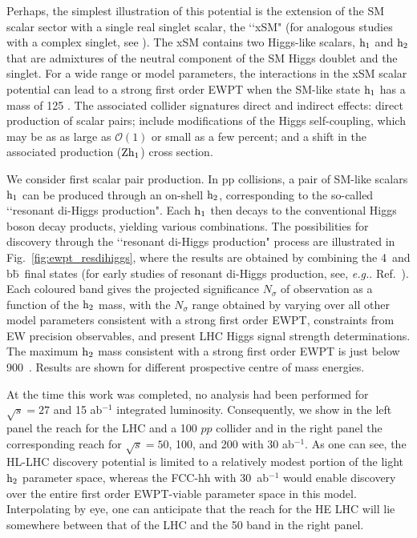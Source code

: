 Perhaps, the simplest illustration of this potential is the extension of the SM scalar sector with a single real singlet scalar\cite{Espinosa:1993bs,Choi:1993cv,Ham:2004cf,Profumo:2007wc,Cline:2012hg,Espinosa:2011ax,No:2013wsa,Curtin:2014jma,Kotwal:2016tex,Brauner:2016fla,Huang:2016cjm,Chen:2017qcz,Huang:2017jws}, the \lq\lq xSM" \cite{Barger:2007im} (for analogous studies with a complex singlet, see \cite{Jiang:2015cwa,Chiang:2017nmu}). 
The xSM contains two Higgs-like scalars, $\rm h_{1}$ and $\rm h_{2}$ that are admixtures of the neutral component of the SM Higgs doublet and the singlet. For a wide range or model parameters, the interactions in the xSM scalar potential can  lead to a strong first order EWPT when the SM-like state $\rm h_1$ has a mass of 125 \UGeV. The associated collider signatures direct and indirect effects:  direct production of scalar pairs; include modifications of the Higgs self-coupling, which may be as as large as $\mathcal{O}(1)$ or small as a few percent; and a shift in the associated production ($\rm Zh_1$) cross section. 

We consider first scalar pair production. In pp collisions, a pair of SM-like scalars $\rm h_1$ can be produced through an on-shell $\rm h_2$, corresponding to the so-called \lq\lq resonant di-Higgs production".  Each $\rm h_1$ then decays to the conventional Higgs boson decay products, yielding various combinations. The possibilities for discovery through the  \lq\lq resonant di-Higgs production" process are illustrated in Fig.~\ref{fig:ewpt_resdihiggs}, where the results are obtained by combining the 4\texttau\ and b\={b}\textgamma\textgamma\ final states\cite{Kotwal:2016tex} (for early studies of resonant di-Higgs production, see, {\it e.g.}. Ref.~\cite{Baur:2003gp}). Each coloured band gives the projected significance $N_\sigma$ of observation as a function of the $\rm h_2$ mass, with the $N_\sigma$ range obtained by varying over all other model parameters consistent with a strong first order EWPT, constraints from EW precision observables, and present LHC Higgs signal strength determinations.  The maximum $\rm h_2$ mass consistent with a strong first order EWPT is just below 900~\UGeV.  Results are shown for different prospective centre of mass energies.

At the time this work was completed, no analysis had been performed for $\sqrt{s} = 27 $ \UTeV and 15 ab$^{-1}$ integrated luminosity. Consequently, we show in the left panel the reach for the LHC and a 100 \UTeV $pp$ collider and in the right panel the corresponding reach for $\sqrt{s} = 50$, 100, and 200 \UTeV with 30 ab$^{-1}$. As one can see, the HL-LHC discovery potential is limited to a relatively modest portion of the light $\rm h_2$ parameter space, whereas the FCC-hh with 30~ab$^{-1}$ would enable discovery over the entire first order EWPT-viable parameter space in this model. Interpolating by eye, one can anticipate that the reach for the HE LHC will lie somewhere between that of the LHC and the 50 \UTeV band in the right panel. 

